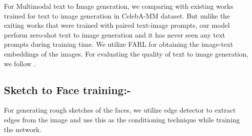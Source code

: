 \documentclass[10pt,twocolumn,letterpaper]{article}
\begin{document}
For Multimodal text to Image generation, we comparing with existing works trained for text to image generation in CelebA-MM dataset. But unlike the exiting works that were trained with paired text-image prompts, our model perform zero-shot text to image generation and it has never seen any text prompts during training time. We utilize FARL\cite{zheng2021farl} for obtaining the image-text embeddings of the images. For evaluating the quality of text to image generation, we follow \cite{xia2021tedigan}. 

\subsection{Sketch to Face training:-}

For generating rough sketches of the faces, we utilize \cite{ding2001canny} edge detector to extract edges from the image and use this as the conditioning technique while training the network.
\end{document}
